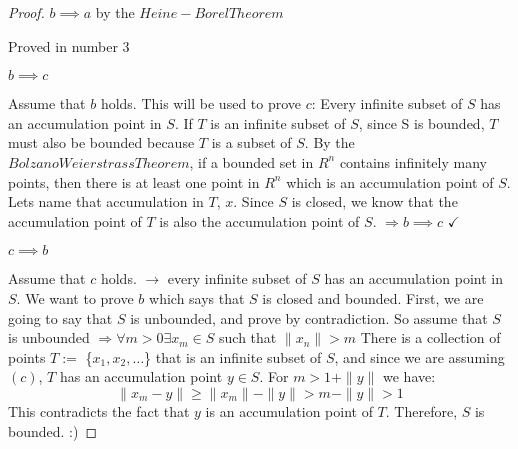\documentclass[aps,pra,notitlepage,amsmath,amssymb,letterpaper,12pt]{revtex4-1}
\begin{document}
\begin{proof}
    \(b\implies a\) by the \(Heine-Borel Theorem\)
    
    Proved in number 3

    \(b\implies c\)

    Assume that \(b\) holds. This will be used to prove \(c\): Every
infinite subset of \(S\) has an accumulation point in \(S\). If \(T\) is
an infinite subset of \(S\), since S is bounded, \(T\) must also be
bounded because \(T\) is a subset of \(S\). By the
\(Bolzano Weierstrass Theorem\), if a bounded set in \(R^n\) contains
infinitely many points, then there is at least one point in \(R^n\)
which is an accumulation point of \(S\). Lets name that accumulation in
\(T\), \(x\). Since \(S\) is closed, we know that the accumulation point
of \(T\) is also the accumulation point of \(S\).
\(\Rightarrow b\implies c\) \(\checkmark\)

    \(c\implies b\)

    Assume that \(c\) holds. \(\rightarrow\) every infinite subset of \(S\)
has an accumulation point in \(S\). We want to prove \(b\) which says
that \(S\) is closed and bounded. First, we are going to say that \(S\)
is unbounded, and prove by contradiction. So assume that \(S\) is
unbounded \(\Rightarrow \forall m>0\exists x_m\in S\) such that
\(\| x_n\| >m\) There is a collection of points \(T:=\)
\{\(x_1,x_2,\ldots\)\} that is an infinite subset of \(S\), and since we
are assuming \((c)\), \(T\) has an accumulation point \(y\in S\). For
\(m>1+\| y\|\) we have: \[\| x_m-y\| \geq\| x_m\| -\|y \| >m-\|y \| >1\]
This contradicts the fact that \(y\) is an accumulation point of \(T\).
Therefore, \(S\) is bounded. :)


\end{proof}
\end{document}
